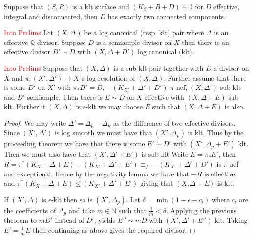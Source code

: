 \documentclass[a4paper,12pt]{book}
\newcommand\myworries[1]{\textcolor{red}{#1}}
\begin{document}
	\begin{lemma}\label{cc} \cite[Proposition 4.37]{kk-singbook}
		Suppose that $(S,B)$ is a klt surface and $(K_{S}+B+D) \sim 0$ for $D$ effective, integral and disconnected, then $D$ has exactly two connected components.
	\end{lemma}

	
\begin{theorem}\cite[Theorem 1]{tanaka2017semiample}\myworries{Into Prelims}
	Let $(X,\Delta)$ be a log canonical (resp. klt) pair where $\Delta$ is an effective $\mathbb{Q}$-divisor. Suppose $D$ is a semiample divisor on $X$ then there is an effective divisor $D'\sim D$ with $(X,\Delta+D')$ log canonical (klt).
\end{theorem}

\begin{corollary}\label{average}\myworries{Into Prelims}
	Suppose that $(X,\Delta)$ is a sub klt pair together with $D$ a divisor on $X$ and $\pi\colon (X',\Delta') \to X$ a log resolution of $(X,\Delta)$. Further assume that there is some $D'$ on $X'$ with $\pi_{*}D'=D$, $-(K_{X'}+\Delta'+D')$ $\pi$-nef, $(X,\Delta')$ sub klt and $D'$ semiample. Then there is $E \sim D$ on $X$ effective with $(X,\Delta+E)$ sub klt. Further if $(X,\Delta)$ is $\epsilon$-klt we may choose $E$ such that $(X,\Delta+E)$ is also.
\end{corollary}
\begin{proof}
	We may write $\Delta'=\Delta_{p}-\Delta_{n}$ as the difference of two effective divisors. Since $(X',\Delta')$ is log smooth we must have that $(X',\Delta_{p})$ is klt. Thus by the proceeding theorem we have that there is some $E' \sim D'$ with $(X',\Delta_{p}+E')$ klt. Then we must also have that $(X',\Delta'+E')$ is sub klt 
	Write $E=\pi_{*}E'$, then $R=\pi^{*}(K_{X}+\Delta+E)- (K_{X'}+\Delta'+E')\equiv_{f}-(K_{X'}+\Delta'+D')$ is $\pi$-nef and exceptional. Hence by the negativity lemma we have that $-R$ is effective, and $\pi^{*}(K_{X}+\Delta+E) \leq (K_{X'}+\Delta'+E')$ giving that $(X,\Delta +E)$ is klt.
	
	If $(X',\Delta)$ is $\epsilon$-klt then so is $(X',\Delta_{p})$. Let $\delta =\min (1-\epsilon-c_{i})$ where $c_{i}$ are the coefficients of $\Delta_{p}$ and take $m \in \mathbb{N}$ such that $\frac{1}{m} < \delta$. Applying the previous theorem to $mD'$ instead of $D'$, yields $E'' \sim mD$ with $(X',\Delta'+E'')$ klt. Taking $E'=\frac{1}{m}E$ then continuing as above gives the required divisor. 
\end{proof}
\end{document}
